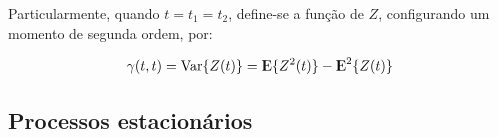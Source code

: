 Particularmente, quando $t = t_1 = t_2$, define-se a função  de $Z$, configurando um momento de segunda ordem, por:

\begin{equation}\label{series:2.7}
\gamma(t, t) = \mathrm{Var}\{Z(t)\} = {\rm I\kern-.3em E}\{Z^2(t)\} - {\rm I\kern-.3em E}^2\{Z(t)\}
\end{equation}

\subsection{Processos estacionários}



